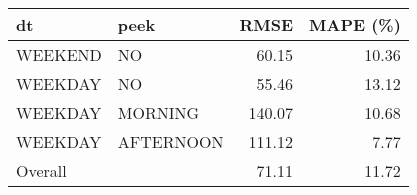 \begin{tabular}{llrr}
 dt & peek & RMSE & MAPE (\%) \\ 
  \hline
\hline
WEEKEND & NO & 60.15 & 10.36 \\ 
   \hline
WEEKDAY & NO & 55.46 & 13.12 \\ 
   \hline
WEEKDAY & MORNING & 140.07 & 10.68 \\ 
   \hline
WEEKDAY & AFTERNOON & 111.12 & 7.77 \\ 
   \hline
\hline
Overall &  & 71.11 & 11.72 \\ 
  \end{tabular}
